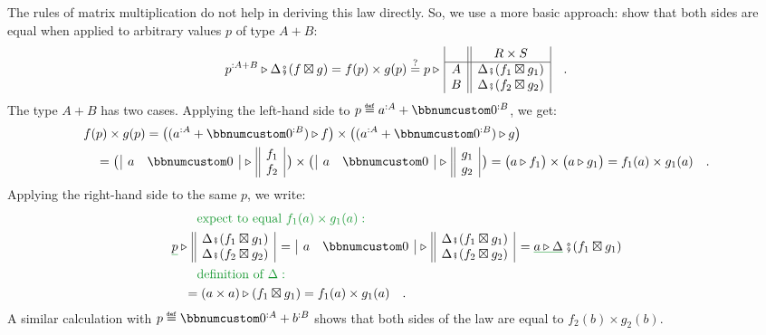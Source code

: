 The rules of matrix multiplication do not help in deriving this law
directly. So, we use a more basic approach: show that both sides are
equal when applied to arbitrary values $p$ of type $A+B$:
\[
p^{:A+B}\triangleright\Delta\bef(f\boxtimes g)=f(p)\times g(p)\overset{?}{=}p\triangleright\,\begin{array}{|c||c|}
 & R\times S\\
\hline A & \Delta\bef(f_{1}\boxtimes g_{1})\\
B & \Delta\bef(f_{2}\boxtimes g_{2})
\end{array}\quad.
\]
The type $A+B$ has two cases. Applying the left-hand side to $p\triangleq a^{:A}+\bbnum 0^{:B}$,
we get:
\begin{align*}
 & f(p)\times g(p)=\big((a^{:A}+\bbnum 0^{:B})\triangleright f\big)\times\big((a^{:A}+\bbnum 0^{:B})\triangleright g\big)\\
 & \quad=\big(\,\begin{array}{|cc|}
a & \bbnum 0\end{array}\,\triangleright\,\begin{array}{||c|}
f_{1}\\
f_{2}
\end{array}\,\big)\times\big(\,\begin{array}{|cc|}
a & \bbnum 0\end{array}\,\triangleright\,\begin{array}{||c|}
g_{1}\\
g_{2}
\end{array}\,\big)=\big(a\triangleright f_{1}\big)\times\big(a\triangleright g_{1}\big)=f_{1}(a)\times g_{1}(a)\quad.
\end{align*}
Applying the right-hand side to the same $p$, we write:
\begin{align*}
 & \quad{\color{greenunder}\quad\text{expect to equal }f_{1}(a)\times g_{1}(a):}\quad\\
 & \gunderline p\triangleright\,\begin{array}{||c|}
\Delta\bef(f_{1}\boxtimes g_{1})\\
\Delta\bef(f_{2}\boxtimes g_{2})
\end{array}\,=\,\begin{array}{|cc|}
a & \bbnum 0\end{array}\,\triangleright\,\begin{array}{||c|}
\Delta\bef(f_{1}\boxtimes g_{1})\\
\Delta\bef(f_{2}\boxtimes g_{2})
\end{array}\,=\gunderline{a\triangleright\Delta}\,\bef(f_{1}\boxtimes g_{1})\\
 & \quad{\color{greenunder}\quad\text{definition of }\Delta:}\quad\\
 & \quad=(a\times a)\triangleright(f_{1}\boxtimes g_{1})=f_{1}(a)\times g_{1}(a)\quad.
\end{align*}
A similar calculation with $p\triangleq\bbnum 0^{:A}+b^{:B}$ shows
that both sides of the law are equal to $f_{2}(b)\times g_{2}(b)$.

